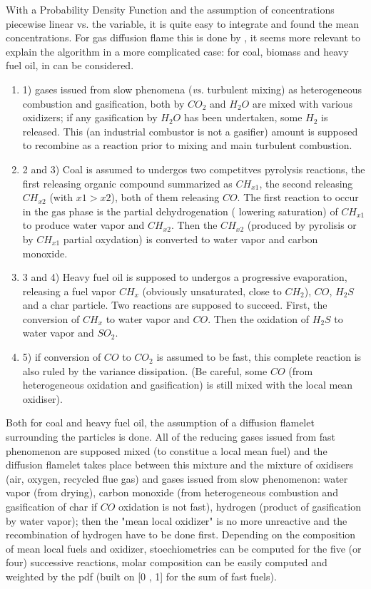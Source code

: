 With a Probability Density Function and the assumption of concentrations
piecewise linear vs. the variable, it is quite easy to integrate and found the
mean concentrations. For gas diffusion flame this is done by , it seems more relevant to explain the algorithm in a more complicated
case: for coal, biomass and heavy fuel oil, in  can be considered.
\begin{enumerate}
\item 1) gases issued from slow phenomena (\emph{vs.} turbulent mixing) as
  heterogeneous combustion and gasification, both by $CO_{2}$ and $H_{2}O$ are
  mixed with various oxidizers; if any gasification by $H_{2}O$ has been
  undertaken, some $H_{2}$ is released. This (an industrial combustor is
  not a gasifier) amount is supposed to recombine as a reaction prior to mixing
  and main turbulent combustion.
\item 2 and 3) Coal is assumed to undergos two competitves pyrolysis reactions,
  the first releasing organic compound summarized as $CH_{x1}$, the second
  releasing $CH_{x2}$ (with $x1 > x2$), both of them releasing $CO$. The first
  reaction to occur in the gas phase is the partial dehydrogenation ( lowering
  saturation) of $CH_{x1}$ to produce water vapor and $CH_{x2}$. Then the
  $CH_{x2}$ (produced by pyrolisis or by $CH_{x1}$ partial oxydation) is
  converted to water vapor and carbon monoxide.
\item 3 and 4) Heavy fuel oil is supposed to undergos a progressive evaporation,
  releasing a fuel vapor $CH_{x}$ (obviously unsaturated, close to $CH_{2}$),
  $CO$, $H_{2}S$ and a char particle. Two reactions are supposed to
  succeed. First, the conversion of $CH_{x}$ to water vapor and $CO$. Then the
  oxidation of $H_{2}S$ to water vapor and $SO_{2}$.
\item 5) if conversion of $CO$ to $CO_{2}$ is assumed to be fast, this complete
  reaction is also ruled by the variance dissipation. (Be careful, some $CO$
  (from heterogeneous oxidation and gasification) is still mixed with the local
  mean oxidiser).
\end{enumerate}
Both for coal and heavy fuel oil, the assumption of a diffusion flamelet
surrounding the particles is done. All of the reducing gases issued from fast
phenomenon are supposed mixed (to constitue a local mean fuel) and the diffusion
flamelet takes place between this mixture and the mixture of oxidisers (air,
oxygen, recycled flue gas) and gases issued from slow phenomenon: water vapor
(from drying), carbon monoxide (from heterogeneous combustion and gasification
of char if $CO$ oxidation is not fast), hydrogen (product of gasification by water
vapor); then the "mean local oxidizer" is no more unreactive and the
recombination of hydrogen have to be done first. Depending on the composition of
mean local fuels and oxidizer, stoechiometries can be computed for the five (or
four) successive reactions, molar composition can be easily computed and
weighted by the pdf (built on [0 , 1] for the sum of fast fuels).

